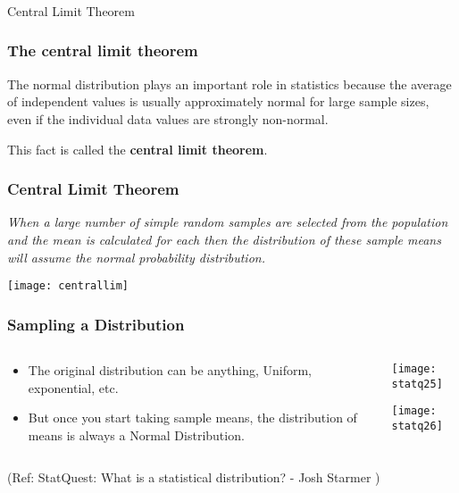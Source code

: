 \begin{frame}[fragile]\frametitle{}
\begin{center}
{\Large Central Limit Theorem}
\end{center}
\end{frame}


\begin{frame}
\frametitle{The central limit theorem}

The normal distribution plays an important role in statistics because
the average of independent values is usually approximately normal for
large sample sizes, even if the individual data values are strongly
non-normal.

This fact is called the {\bf central limit theorem}.

\end{frame}

\begin{frame}[fragile]\frametitle{Central Limit Theorem}

{\em When a large number of simple random samples are selected from the population and the mean is calculated for each then the distribution of these sample means will assume the normal probability distribution.  }
 
\begin{center}
\texttt{[image: centrallim]}
\end{center}
\end{frame}
%
\begin{frame}[fragile]\frametitle{Sampling a Distribution}
\begin{columns}
    \begin{column}[T]{0.6\linewidth}
	\begin{itemize}
	\item The original distribution can be anything, Uniform, exponential, etc.
	\item But once you start taking sample means, the distribution of means is always a Normal Distribution.
	\end{itemize}

    \end{column}
    \begin{column}[T]{0.4\linewidth}
      \begin{center}
      \texttt{[image: statq25]}
	  
	  \texttt{[image: statq26]}
	   
	  	\end{center}
    \end{column}

  \end{columns}
  
\tiny{(Ref: StatQuest: What is a statistical distribution? - Josh Starmer )}
\end{frame}


